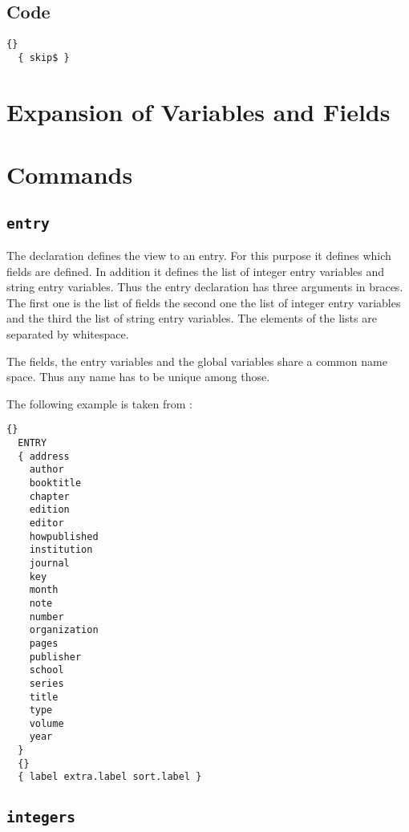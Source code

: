 \subsection{Code}\label{sec:bst.code}

\INCOMPLETE

\begin{lstlisting}{}
  { skip$ }
\end{lstlisting}

\section{Expansion of Variables and Fields}

\INCOMPLETE



\section{Commands}

\subsection{\texttt{entry}}%

The declaration defines the view to an entry. For this purpose it
defines which fields are defined. In addition it defines the list of
integer entry variables and string entry variables. Thus the entry
declaration has three arguments in braces. The first one is the list
of fields the second one the list of integer entry variables and the
third the list of string entry variables. The elements of the lists
are separated by whitespace.

The fields, the entry variables and the global variables share a
common name space. Thus any name has to be unique among those.

The following example is taken from :

\begin{lstlisting}{}
  ENTRY
  { address
    author
    booktitle
    chapter
    edition
    editor
    howpublished
    institution
    journal
    key
    month
    note
    number
    organization
    pages
    publisher
    school
    series
    title
    type
    volume
    year
  }
  {}
  { label extra.label sort.label }
\end{lstlisting}


\subsection{\texttt{integers}}%

